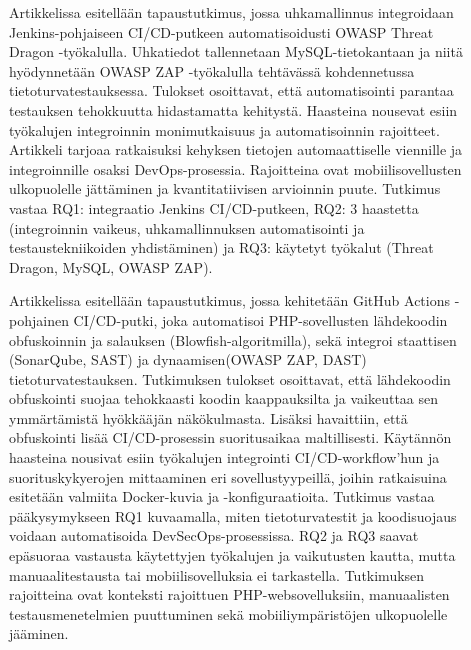 \documentclass[bscthesis,finnish,oneside,biblatex]{uefcsthesis}
\begin{document}
\begin{description}
    \item[\cite{nikolov2024_fit}] Artikkelissa esitellään tapaustutkimus, jossa uhkamallinnus integroidaan Jenkins-pohjaiseen CI/CD-putkeen automatisoidusti OWASP Threat Dragon -työkalulla. Uhkatiedot tallennetaan MySQL-tietokantaan ja niitä hyödynnetään OWASP ZAP -työkalulla tehtävässä kohdennetussa tietoturvatestauksessa. Tulokset osoittavat, että automatisointi parantaa testauksen tehokkuutta hidastamatta kehitystä. Haasteina nousevat esiin työkalujen integroinnin monimutkaisuus ja automatisoinnin rajoitteet. Artikkeli tarjoaa ratkaisuksi kehyksen tietojen automaattiselle viennille ja integroinnille osaksi DevOps-prosessia. Rajoitteina ovat mobiilisovellusten ulkopuolelle jättäminen ja kvantitatiivisen arvioinnin puute. Tutkimus vastaa RQ1: integraatio Jenkins CI/CD-putkeen, RQ2: 3 haastetta (integroinnin vaikeus, uhkamallinnuksen automatisointi ja testaustekniikoiden yhdistäminen) ja RQ3: käytetyt työkalut (Threat Dragon, MySQL, OWASP ZAP).
\end{description}

\begin{description}
    \item[\cite{afifah2024_coi}] Artikkelissa esitellään tapaustutkimus, jossa kehitetään GitHub Actions -pohjainen CI/CD-putki, joka automatisoi PHP-sovellusten lähdekoodin obfuskoinnin ja salauksen (Blowfish-algoritmilla), sekä integroi staattisen (SonarQube, SAST) ja dynaamisen(OWASP ZAP, DAST) tietoturvatestauksen. Tutkimuksen tulokset osoittavat, että lähdekoodin obfuskointi suojaa tehokkaasti koodin kaappauksilta ja vaikeuttaa sen ymmärtämistä hyökkääjän näkökulmasta. Lisäksi havaittiin, että obfuskointi lisää CI/CD-prosessin suoritusaikaa maltillisesti. Käytännön haasteina nousivat esiin työkalujen integrointi CI/CD-workflow’hun ja suorituskykyerojen mittaaminen eri sovellustyypeillä, joihin ratkaisuina esitetään valmiita Docker-kuvia ja -konfiguraatioita. Tutkimus vastaa pääkysymykseen RQ1 kuvaamalla, miten tietoturvatestit ja koodisuojaus voidaan automatisoida DevSecOps-prosessissa. RQ2 ja RQ3 saavat epäsuoraa vastausta käytettyjen työkalujen ja vaikutusten kautta, mutta manuaalitestausta tai mobiilisovelluksia ei tarkastella. Tutkimuksen rajoitteina ovat konteksti rajoittuen PHP-websovelluksiin, manuaalisten testausmenetelmien puuttuminen sekä mobiiliympäristöjen ulkopuolelle jääminen.
\end{description}
\end{document}
